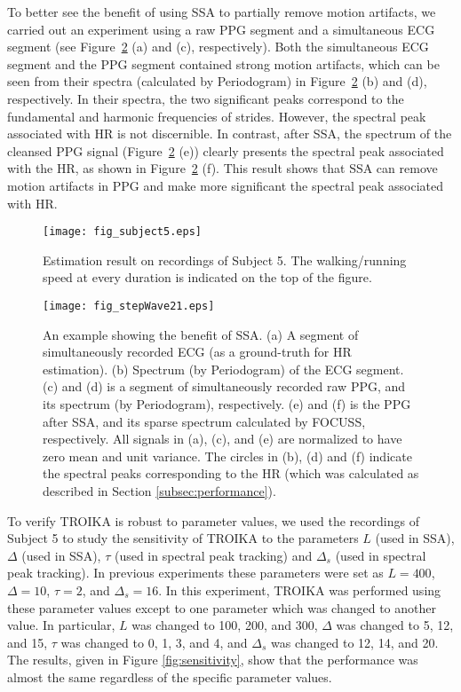 \documentclass[10pt,twocolumn]{IEEEtran}
\begin{document}
To better see the benefit of using SSA to partially remove motion artifacts,  we carried out an experiment using a raw PPG segment and a simultaneous ECG segment (see Figure~\ref{fig:stepResult} (a) and (c), respectively). Both the simultaneous ECG segment and the PPG segment contained strong motion artifacts, which can be seen from their spectra (calculated by Periodogram) in Figure~\ref{fig:stepResult} (b) and (d), respectively. In their spectra, the two significant peaks correspond to the fundamental and harmonic frequencies of strides. However, the spectral peak associated with HR is not discernible. In contrast, after SSA, the spectrum of the cleansed PPG signal (Figure~\ref{fig:stepResult} (e)) clearly presents the spectral peak associated with the HR, as shown in Figure~\ref{fig:stepResult} (f). This result shows that SSA can remove motion artifacts in PPG and make more significant the spectral peak associated with HR.





\begin{figure}[t]
\centering
\texttt{[image: fig\_subject5.eps]}
\caption{Estimation result on recordings of Subject 5. The walking/running speed at every duration is indicated on the top of the figure.  }
\label{fig:sub5}
\end{figure}




\begin{figure}[t]
\centering
\texttt{[image: fig\_stepWave21.eps]}
\caption{An example showing the benefit of SSA. (a) A segment of simultaneously recorded ECG (as a ground-truth for HR estimation). (b) Spectrum (by Periodogram) of the ECG segment. (c) and (d) is a segment of simultaneously recorded raw PPG, and its spectrum (by Periodogram), respectively. (e) and (f) is the PPG after SSA, and its sparse spectrum calculated by FOCUSS, respectively. All signals in (a), (c), and (e) are normalized to have zero mean and unit variance. The circles in (b), (d) and (f) indicate the spectral peaks corresponding to the HR (which was  calculated as described in Section \ref{subsec:performance}). }
\label{fig:stepResult}
\end{figure}

To verify TROIKA is robust to parameter values, we used the recordings of Subject 5 to study the sensitivity of TROIKA to the parameters $L$ (used in SSA), $\Delta$ (used in SSA), $\tau$ (used in spectral peak tracking) and $\Delta_s$ (used in spectral peak tracking). In previous experiments these parameters were set as $L=400$, $\Delta=10$, $\tau=2$, and $\Delta_s=16$. In this experiment, TROIKA was performed using these parameter values except to one parameter which was changed to another value. In particular, $L$ was changed to 100, 200, and 300, $\Delta$ was changed to 5, 12, and 15, $\tau$ was changed to 0, 1, 3, and 4, and $\Delta_s$ was changed to 12, 14, and 20. The results, given in Figure \ref{fig:sensitivity}, show that the performance was almost the same regardless of the specific parameter values.
\end{document}

